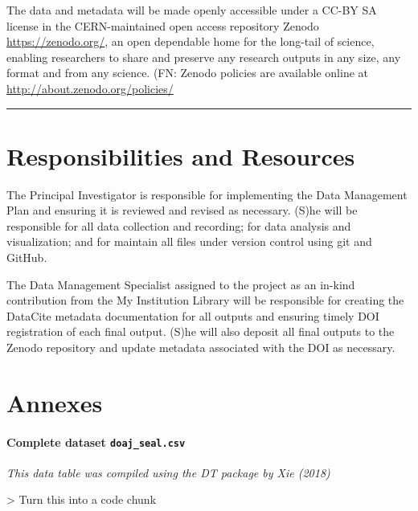 \documentclass[]{article}
\let\oldparagraph\paragraph
\renewcommand{\paragraph}[1]{\oldparagraph{#1}\mbox{}}
\begin{document}
The data and metadata will be made openly accessible under a CC-BY SA
license in the CERN-maintained open access repository Zenodo
\url{https://zenodo.org/}, an open dependable home for the long-tail of
science, enabling researchers to share and preserve any research outputs
in any size, any format and from any science. (FN: Zenodo policies are
available online at \url{http://about.zenodo.org/policies/}

\begin{center}\rule{0.5\linewidth}{\linethickness}\end{center}

\section{Responsibilities and
Resources}\label{responsibilities-and-resources}

The Principal Investigator is responsible for implementing the Data
Management Plan and ensuring it is reviewed and revised as necessary.
(S)he will be responsible for all data collection and recording; for
data analysis and visualization; and for maintain all files under
version control using git and GitHub.

The Data Management Specialist assigned to the project as an in-kind
contribution from the My Institution Library will be responsible for
creating the DataCite metadata documentation for all outputs and
ensuring timely DOI registration of each final output. (S)he will also
deposit all final outputs to the Zenodo repository and update metadata
associated with the DOI as necessary.

\section*{Annexes}\label{annexes}

\hypertarget{annex-table}{\paragraph{\texorpdfstring{Complete dataset
\texttt{doaj\_seal.csv}}{Complete dataset doaj\_seal.csv}}\label{annex-table}}

\emph{This data table was compiled using the DT package by Xie (2018)}

\textbar{}\textbar{}\textgreater{} Turn this into a code chunk
\end{document}

